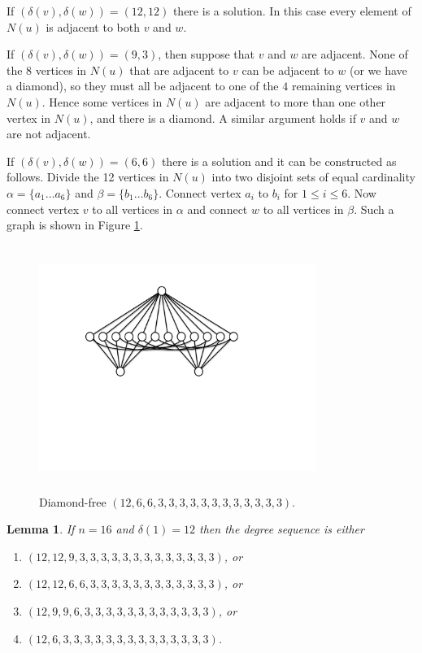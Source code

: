 \documentclass{l4proj}
\newtheorem{lemma}{Lemma}
\begin{document}
If $(\delta(v),\delta(w)) = (12,12)$ there is a solution. In this case every element of $N(u)$ is adjacent to both $v$ and $w$.

If $(\delta(v),\delta(w)) =(9,3)$, then suppose that $v$ and $w$ are adjacent. None of the $8$ vertices in $N(u)$ that are adjacent to $v$ 
can be adjacent to $w$ (or we have a diamond), so they must all be adjacent to one of the $4$ remaining vertices in $N(u)$. Hence some vertices 
in $N(u)$ are adjacent to more than one other vertex in $N(u)$, and there is a diamond. A similar argument holds if $v$ and $w$ are not adjacent. 

If $(\delta(v),\delta(w)) = (6,6)$ there is a solution and it can be constructed as follows. Divide the 12 vertices in $N(u)$ into two 
disjoint sets of equal cardinality $\alpha = \{a_1 \ldots a_6\}$ and $\beta = \{b_1 \ldots b_6\}$. Connect vertex $a_i$ to $b_i$ for
$1 \leq i \leq 6$. Now connect vertex $v$ to all vertices in $\alpha$ and connect $w$ to all vertices in $\beta$. Such a graph is shown
in Figure \ref{fig:g15}.

\begin{figure}
\centering
\includegraphics[height=8.0cm,width=9.0cm]{g15}
\vspace{-4cm}
\caption{Diamond-free $(12,6,6,3,3,3,3,3,3,3,3,3,3,3,3)$.}
\label{fig:g15}
\end{figure}
 
\begin{lemma} If $n=16$ and $\delta(1)=12$ then the degree sequence is either
\begin{enumerate}
\item $(12,12,9,3,3,3,3,3,3,3,3,3,3,3,3,3)$, or 
\vspace{-8pt}
\item $(12,12,6,6,3,3,3,3,3,3,3,3,3,3,3,3)$, or
\vspace{-8pt}
\item  $(12,9,9,6,3,3,3,3,3,3,3,3,3,3,3,3)$, or
\vspace{-8pt}
\item  $(12,6,3,3,3,3,3,3,3,3,3,3,3,3,3,3)$.
\end{enumerate}
\end{lemma}
\end{document}
